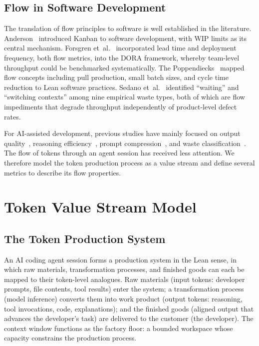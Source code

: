 \documentclass[journal]{IEEEtran}
\begin{document}
\subsection{Flow in Software Development}

The translation of flow principles to software is well established in the literature. Anderson~\cite{anderson2010} introduced Kanban to software development, with WIP limits as its central mechanism. Forsgren et~al.~\cite{forsgren2018} incorporated lead time and deployment frequency, both flow metrics, into the DORA framework, whereby team-level throughput could be benchmarked systematically. The Poppendiecks~\cite{poppendieck2003, poppendieck2006} mapped flow concepts including pull production, small batch sizes, and cycle time reduction to Lean software practices. Sedano et~al.~\cite{sedano2017} identified ``waiting'' and ``switching contexts'' among nine empirical waste types, both of which are flow impediments that degrade throughput independently of product-level defect rates.

For AI-assisted development, previous studies have mainly focused on output quality~\cite{chen2021}, reasoning efficiency~\cite{apple_illusion2025, nous_thinking2025, selfbudgeter2025}, prompt compression~\cite{llmlingua2_2024}, and waste classification~\cite{griffin2026ter}. The flow of tokens through an agent session has received less attention. We therefore model the token production process as a value stream and define several metrics to describe its flow properties.

\section{Token Value Stream Model}
\label{sec:model}

\subsection{The Token Production System}

An AI coding agent session forms a production system in the Lean sense, in which raw materials, transformation processes, and finished goods can each be mapped to their token-level analogues. Raw materials (input tokens: developer prompts, file contents, tool results) enter the system; a transformation process (model inference) converts them into work product (output tokens: reasoning, tool invocations, code, explanations); and the finished goods (aligned output that advances the developer's task) are delivered to the customer (the developer). The context window functions as the factory floor: a bounded workspace whose capacity constrains the production process.
\end{document}
